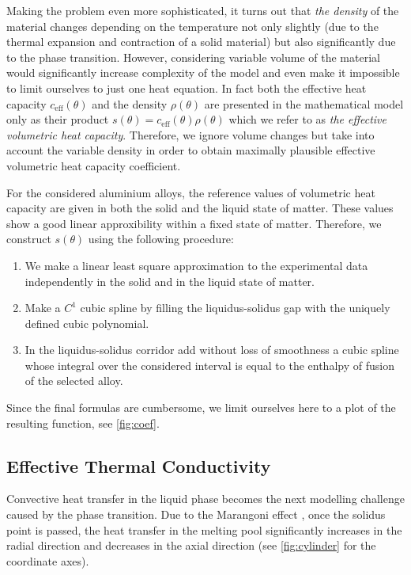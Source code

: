 Making the problem even more sophisticated, it turns out that \emph{the density} of the material changes depending on the temperature not only slightly (due to the thermal expansion and contraction of a solid material) but also significantly due to the phase transition. However, considering variable volume of the material would significantly increase complexity of the model and even make it impossible to limit ourselves to just one heat equation. In fact both the effective heat capacity $c_\text{eff}(\theta)$ and the density $\rho(\theta)$ are presented in the mathematical model only as their product $s(\theta) = c_\text{eff}(\theta) \rho(\theta)$ which we refer to as \emph{the effective volumetric heat capacity}. Therefore, we ignore volume changes but take into account the variable density in order to obtain maximally plausible effective volumetric heat capacity coefficient.

For the considered aluminium alloys, the reference values of volumetric heat capacity are given in both the solid and the liquid state of matter. These values show a good linear approxibility within a fixed state of matter. Therefore, we construct $s(\theta)$ using the following procedure:
\begin{enumerate}
	\item We make a linear least square approximation to the experimental data independently in the solid and in the liquid state of matter.
	\item Make a $C^1$ cubic spline by filling the liquidus-solidus gap with the uniquely defined cubic polynomial.
	\item In the liquidus-solidus corridor add without loss of smoothness a cubic spline whose integral over the considered interval is equal to the enthalpy of fusion of the selected alloy.
\end{enumerate}

Since the final formulas are cumbersome, we limit ourselves here to a plot of the resulting function, see \cref{fig:coef}.


\subsection{Effective Thermal Conductivity}
\label{subsec:conductivity}

Convective heat transfer in the liquid phase becomes the next modelling challenge caused by the phase transition. Due to the Marangoni effect , once the solidus point is passed, the heat transfer in the melting pool significantly increases in the radial direction and decreases in the axial direction (see \cref{fig:cylinder} for the coordinate axes).

